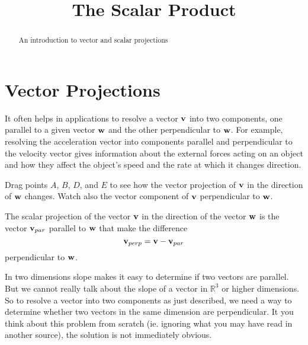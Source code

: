 \documentclass{ximera}
\title{The Scalar Product}
\begin{document}
\begin{abstract}
An introduction to vector and scalar projections
\end{abstract}
\maketitle

\section{Vector Projections}

It often helps in applications to resolve a vector ${\bf v}$ into two components, one parallel to a given vector ${\bf w}$ and the other perpendicular to ${\bf w}$. For example, resolving the acceleration vector into components parallel and perpendicular to the velocity vector gives information about the external forces acting on an object and how they affect the object's speed and the rate at which it changes direction.


\begin{exploration}
Drag points $A$, $B$, $D$, and $E$ to see how the vector projection of ${\bf v}$ in the direction of ${\bf w}$ changes. Watch also the vector component of ${\bf v}$ perpendicular to ${\bf w}$.
 
\begin{onlineOnly}
    \begin{center}
\end{center}
\end{onlineOnly}
\end{exploration}





The scalar projection of the vector ${\bf v}$ in the direction of the vector ${\bf w}$ is the vector ${\bf v}_{par}$ parallel to ${\bf w}$ that make the difference
\[
      {\bf v}_{perp} = {\bf v} - {\bf v}_{par}
\]
perpendicular to ${\bf w}$.

In two dimensions slope makes it easy to determine if two vectors are parallel. But we cannot really talk about the slope of a vector in $\mathbb{R}^3$ or higher dimensions. So to resolve a vector into two components as just described, we need a way to determine whether two vectors in the same dimension are perpendicular. It you think about this problem from scratch (ie. ignoring what you may have read in another source), the solution is not immediately obvious.
\end{document}
